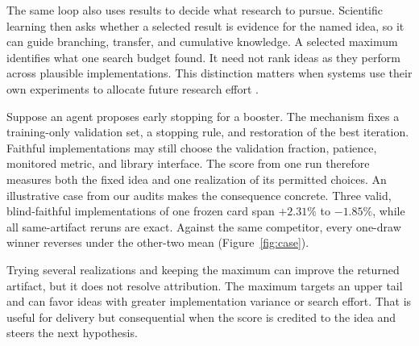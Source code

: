 \documentclass[letterpaper]{article}
\begin{document}
The same loop also uses results to decide what research to pursue. Scientific learning then asks whether a selected result is evidence for the named idea, so it can guide branching, transfer, and cumulative knowledge. A selected maximum identifies what one search budget found. It need not rank ideas as they perform across plausible implementations. This distinction matters when systems use their own experiments to allocate future research effort \cite{wang2023scientificdiscovery}.

Suppose an agent proposes early stopping for a booster. The mechanism fixes a training-only validation set, a stopping rule, and restoration of the best iteration. Faithful implementations may still choose the validation fraction, patience, monitored metric, and library interface. The score from one run therefore measures both the fixed idea and one realization of its permitted choices. An illustrative case from our audits makes the consequence concrete. Three valid, blind-faithful implementations of one frozen card span $+2.31\%$ to $-1.85\%$, while all same-artifact reruns are exact. Against the same competitor, every one-draw winner reverses under the other-two mean (Figure~\ref{fig:case}).

Trying several realizations and keeping the maximum can improve the returned artifact, but it does not resolve attribution. The maximum targets an upper tail and can favor ideas with greater implementation variance or search effort. That is useful for delivery but consequential when the score is credited to the idea and steers the next hypothesis.
\end{document}
